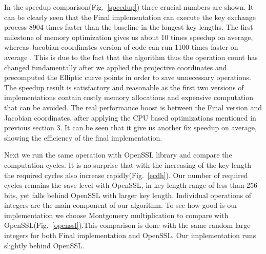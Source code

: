 In the speedup comparison(Fig.~\ref{speedup}) three crucial numbers are shown. It can be clearly seen that the Final implementation can execute the key exchange process 8904 times faster than the baseline in the longest key lengths. The first milestone of memory optimization gives us about 10 times speedup on average, whereas Jacobian coordinates version of code can run 1100 times faster on average . This is due to the fact that the algorithm thus the operation count has changed fundamentally after we applied the projective coordinates and precomputed the Elliptic curve points in order to save unnecessary operations. The speedup result is satisfactory and reasonable as the first two versions of implementations contain costly memory allocations and expensive computation that can be avoided. The real performance boost is between the Final version and Jacobian coordinates, after applying the CPU based optimizations mentioned in previous section 3. It can be seen that it give us another 6x speedup on average, showing the efficiency of the final implementation.

Next we run the same operation with OpenSSL library and compare the computation cycles. It is no surprise that with the increasing of the key length the required cycles also increase rapidly(Fig.~\ref{ecdh}). Our number of required cycles remains the save level with OpenSSL, in key length range of less than 256 bits, yet falls behind OpenSSL with larger key length. Individual operations of integers are the main component of our algorithm. To see how good is our implementation we choose Montgomery multiplication to compare with OpenSSL(Fig.~\ref{openssl}).This comparison is done with the same random large integers for both Final implementation and OpenSSL. Our implementation runs slightly behind OpenSSL. 

